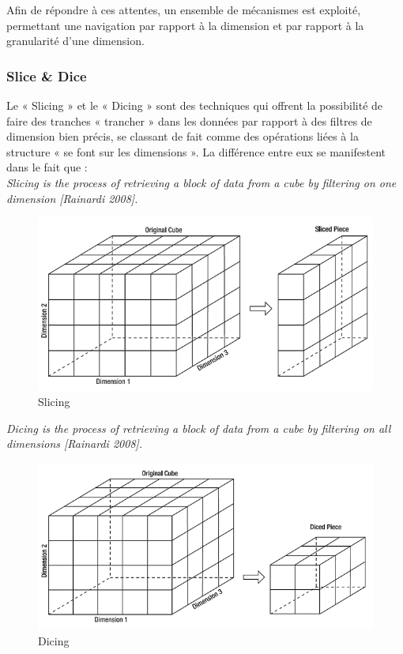 Afin de répondre à ces attentes, un ensemble de mécanismes est exploité, permettant une navigation par rapport à la dimension et par rapport à la granularité d’une dimension.

  \subsubsection{Slice \& Dice}
  Le « Slicing » et le « Dicing » sont des techniques qui offrent la possibilité de faire des tranches « trancher » dans les données par rapport à des filtres de dimension bien précis, se classant de fait comme des opérations liées à la structure « se font sur les dimensions ». La différence entre eux se manifestent dans le fait que :\\
  
  \textit{Slicing is the process of retrieving a block of data from a cube by filtering on one dimension [Rainardi 2008].} 
   
   \begin{figure}[h]
	\begin{center}
		\includegraphics[scale=0.85]{images/slicing.png}
		\caption{Slicing}
		\label{slicing-image}
	\end{center}
   \end{figure}

\textit{Dicing is the process of retrieving a block of data from a cube by filtering on all dimensions [Rainardi 2008].}
  
    \begin{figure}[h]
	\begin{center}
		\includegraphics[scale=0.85]{images/dicing.png}
		\caption{Dicing}
		\label{slicing-image}
	\end{center}
   \end{figure}
   
